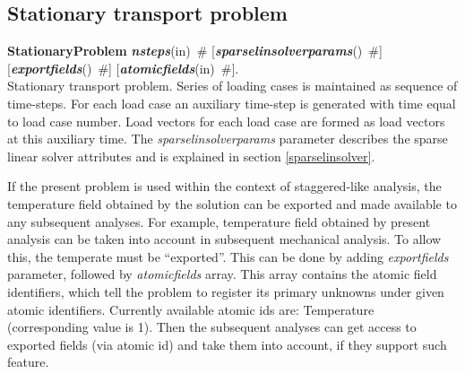 \documentclass[draft]{article}
\newcommand{\param}[1]{{\em #1}}
\newcommand{\keywordnotype}[1]{\mbox{{\it{\bf{#1}}}}}
\newcommand{\keyword}[2]{\mbox{{\keywordnotype{#1}\tiny (#2)}}}
\newcommand{\entKeywordInst}[1]{\mbox{{\bf{{#1}}}}}
\newcommand{\field}[2]{\mbox{\keyword{#1}{#2}~\#}}
\newcommand{\optField}[2]{\mbox{[\field{#1}{#2}]}}
\begin{document}
\subsection{Stationary transport problem}
\label{StationaryTransport}
\entKeywordInst{StationaryProblem} \field{nsteps}{in}
\optField{sparselinsolverparams}{}\\ \optField{exportfields}{}
\optField{atomicfields}{in}.\\
Stationary transport problem. 
Series of loading cases is maintained as sequence of time-steps.
For each load case an auxiliary time-step is generated with time
equal to load case number.
Load vectors for each load case are formed as load vectors at
this auxiliary time.
The  \param{sparselinsolverparams} parameter describes the sparse
linear solver attributes and is explained in section \ref{sparselinsolver}.

If the present problem is used within the context
of staggered-like analysis, the temperature field obtained by the
solution can be exported and made available to any subsequent
analyses. For example, temperature field obtained by present analysis
can be taken into account in subsequent mechanical analysis.
To allow this, the temperate must be ``exported''. This can be done
by adding \param{exportfields} parameter, followed by
\param{atomicfields} array. This array contains the atomic field
identifiers, which tell the problem to register its primary unknowns
under given atomic identifiers. Currently available atomic ids are:
Temperature (corresponding value is 1).
Then the subsequent analyses can get access to exported fields (via
atomic id) and take them into account, if they support such feature.
\end{document}
